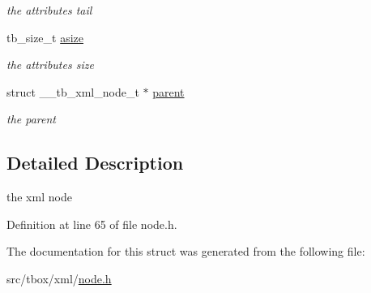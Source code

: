 \begin{DoxyCompactItemize}
\begin{DoxyCompactList}\small\item\em the attributes tail \end{DoxyCompactList}\item 
\hypertarget{structtb__xml__node__t_ae7bcca1bddf704b6db4ab6036eb13fcf}{tb\-\_\-size\-\_\-t \hyperlink{structtb__xml__node__t_ae7bcca1bddf704b6db4ab6036eb13fcf}{asize}}\label{structtb__xml__node__t_ae7bcca1bddf704b6db4ab6036eb13fcf}

\begin{DoxyCompactList}\small\item\em the attributes size \end{DoxyCompactList}\item 
\hypertarget{structtb__xml__node__t_a146614c00a134daafbb8606c6d71b8d3}{struct \-\_\-\-\_\-tb\-\_\-xml\-\_\-node\-\_\-t $\ast$ \hyperlink{structtb__xml__node__t_a146614c00a134daafbb8606c6d71b8d3}{parent}}\label{structtb__xml__node__t_a146614c00a134daafbb8606c6d71b8d3}

\begin{DoxyCompactList}\small\item\em the parent \end{DoxyCompactList}\end{DoxyCompactItemize}


\subsection{Detailed Description}
the xml node 

Definition at line 65 of file node.\-h.



The documentation for this struct was generated from the following file\-:\begin{DoxyCompactItemize}
\item 
src/tbox/xml/\hyperlink{node_8h}{node.\-h}\end{DoxyCompactItemize}

